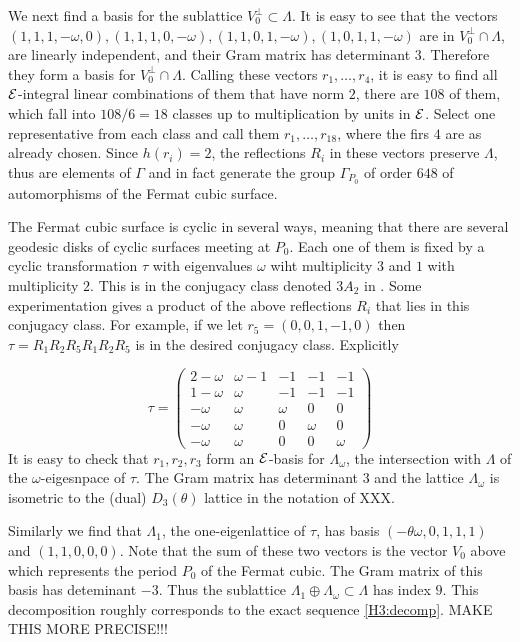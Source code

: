  We next find a basis for the sublattice $V_0^\bot \subset\Lambda$. It is easy to see
that the vectors $(1,1,1,-\omega,0), (1,1,1,0,-\omega), (1,1,0,1,-\omega),
(1,0,1,1,-\omega)$ are in $V_0^\bot\cap\Lambda$, are linearly independent, and their
Gram matrix has determinant $3$. Therefore they form a basis for $V_0^\bot\cap\Lambda$.
Calling these vectors $r_1,\dots,r_4$, it is easy to find all ${ \mathcal E }$-integral linear
combinations of them that have norm $2$, there are $108$ of them, which fall into
$108/6 = 18$ classes up to multiplication by units in ${ \mathcal E }$. Select one representative
from each class and call them $r_1,\dots,r_{18}$, where the firs $4$ are as already
chosen. Since $h(r_i) = 2$, the reflections $R_i$ in these vectors preserve $\Lambda$,
thus are elements of $\Gamma$ and in fact generate the group $\Gamma_{P_0}$ of order
$648$ of automorphisms of the Fermat cubic surface.

 The Fermat cubic surface is cyclic in several ways, meaning that there are several
geodesic disks of cyclic surfaces meeting at $P_0$. Each one of them is fixed by a
cyclic transformation $\tau$ with eigenvalues $\omega$ wiht multiplicity $3$ and $1$
with multiplicity $2$. This is in the conjugacy class denoted $3 A_2$ in
\cite{Dolgachev, Hosoh}. Some experimentation gives a product of the above reflections
$R_i$ that lies in this conjugacy class. For example, if we let $r_5 = (0,0,1,-1,0)$
then $\tau = R_1R_2R_5R_1R_2R_5$ is in the desired conjugacy class. Explicitly

\begin{equation} \label{eq-tau} \tau = \left(\begin{array}{ccccc} 2 - \omega & \omega -
1 & -1 & -1 & -1 \\1 -\omega & \omega & -1 & -1 & -1 \\ -\omega & \omega & \omega & 0 &
0 \\ -\omega & \omega & 0 & \omega & 0 \\ -\omega & \omega & 0 & 0 & \omega
\end{array}\right) \end{equation} It is easy to check that $r_1, r_2, r_3$ form an
${ \mathcal E }$-basis for $\Lambda_\omega$, the intersection with $\Lambda$ of the
$\omega$-eigesnpace of $\tau$. The Gram matrix has determinant $3$ and the lattice
$\Lambda_\omega$ is isometric to the (dual) $D_3(\theta)$ lattice in the notation of
XXX. 

Similarly we find that $\Lambda_1$, the one-eigenlattice of $\tau$, has basis
$(-\theta\omega,0,1,1,1)$ and $(1,1,0,0,0)$. Note that the sum of these two vectors is
the vector $V_0$ above which represents the period $P_0$ of the Fermat cubic. The Gram
matrix of this basis has deteminant $-3$. Thus the sublattice
$\Lambda_1\oplus\Lambda_\omega\subset\Lambda$ has index $9$.  This
decomposition roughly corresponds to the exact sequence \ref{H3:decomp}. MAKE THIS MORE
PRECISE!!!

